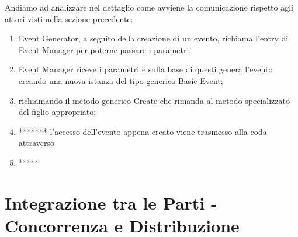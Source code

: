 \documentclass[aps,letterpaper,10pt]{article}
\begin{document}
Andiamo ad analizzare nel dettaglio come avviene la comunicazione rispetto agli attori visti nella sezione precedente:

\begin{enumerate}
	\item Event Generator, a seguito della creazione di un evento, richiama l'entry di Event Manager per poterne passare i parametri;
	\item Event Manager riceve i parametri e sulla base di questi genera l'evento creando una nuova istanza del tipo generico Basic Event;
	\item richiamando il metodo generico Create che rimanda al metodo specializzato del figlio appropriato;
	\item ******* l'accesso dell'evento appena creato viene trasmesso alla coda attraverso 
	\item *****
\end{enumerate}



\subsection{}

\newpage

\section{Integrazione tra le Parti - Concorrenza e Distribuzione}
\end{document}

